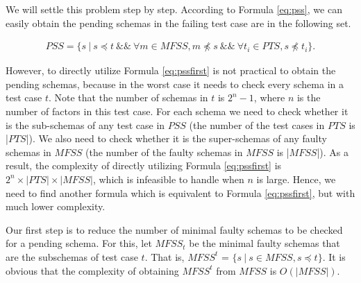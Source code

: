 We will settle this problem step by step.  According to Formula \ref{eq:pss}, we can easily obtain the pending schemas in the failing test case are in the following set.


\begin{equation}
\begin{aligned}\label{eq:pssfirst}
PSS=\{ s\ |\ s \preceq t\ \&\&\ \forall m \in MFSS,  m \npreceq s  \ \&\&\  \forall t_{i} \in PTS, s \npreceq t_{i} \} .
\end{aligned}
\end{equation}


However, to directly utilize Formula \ref{eq:pssfirst} is not practical to obtain the pending schemas, because in the worst case it needs to check every schema in a test case $t$. Note that the number of schemas in $t$ is $2^{n} - 1$, where $n$ is the number of factors in this test case. For each schema we need to check whether it is the sub-schemas of any test case in $PSS$ (the number of the test cases in $PTS$ is |$PTS$|). We also need to check whether it is the super-schemas of any faulty schemas in $MFSS$ (the number of the faulty schemas in $MFSS$ is |$MFSS$|). As a result, the complexity of directly utilizing Formula \ref{eq:pssfirst} is $2^{n} \times |PTS| \times |MFSS|$, which is infeasible to handle when $n$ is large. Hence, we need to find another formula which is equivalent to Formula \ref{eq:pssfirst}, but with much lower complexity.

Our first step is to reduce the number of minimal faulty schemas to be checked for a pending schema.  For this, let $MFSS_{t}$ be the minimal faulty schemas that are the subschemas of test case $t$. That is, $MFSS^{t}$ = $\{ s\ | \ s \in MFSS, s \preceq t \}$.  It is obvious that the complexity of obtaining $MFSS^{t}$ from $MFSS$ is $O(|MFSS|)$.


